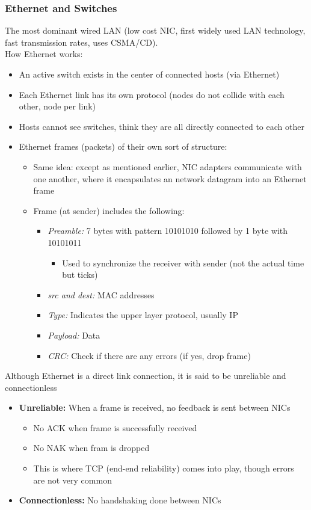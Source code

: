 \documentclass{article}
\begin{document}
\subsubsection{Ethernet and Switches}
The most dominant wired LAN (low cost NIC, first widely used LAN technology, fast transmission 
rates, uses CSMA/CD). \\
How Ethernet works:
\begin{itemize}
    \item An active switch exists in the center of connected hosts (via Ethernet)
    \item Each Ethernet link has its own protocol (nodes do not collide with each other, node per link)
    \item Hosts cannot see switches, think they are all directly connected to each other
    \item Ethernet frames (packets) of their own sort of structure:
    \begin{itemize}
        \item Same idea: except as mentioned earlier, NIC adapters communicate with one another, where
        it encapsulates an network datagram into an Ethernet frame
        \item Frame (at sender) includes the following:
        \begin{itemize}
            \item \textit{Preamble:} 7 bytes with pattern 10101010 followed by 1 byte with 10101011
            \begin{itemize}
                \item Used to synchronize the receiver with sender (not the actual time but ticks)
            \end{itemize}
            \item \textit{src and dest:} MAC addresses
            \item \textit{Type:} Indicates the upper layer protocol, usually IP
            \item \textit{Payload:} Data
            \item \textit{CRC:} Check if there are any errors (if yes, drop frame)
        \end{itemize}
    \end{itemize}
\end{itemize}
Although Ethernet is a direct link connection, it is said to be unreliable and connectionless
\begin{itemize}
    \item \textbf{Unreliable:} When a frame is received, no feedback is sent between NICs
    \begin{itemize}
        \item No ACK when frame is successfully received
        \item No NAK when fram is dropped
        \item This is where TCP (end-end reliability) comes into play, though errors are not very common
    \end{itemize}
    \item \textbf{Connectionless:} No handshaking done between NICs
\end{itemize}
\end{document}
